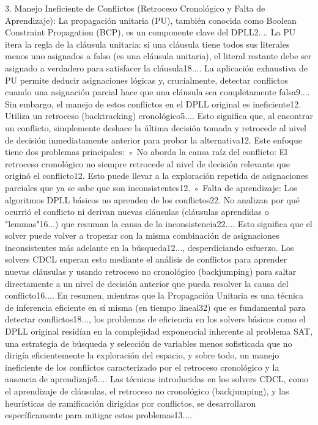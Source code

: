 3.
Manejo Ineficiente de Conflictos (Retroceso Cronológico y Falta de Aprendizaje): La propagación unitaria (PU), también conocida como Boolean Constraint Propagation (BCP), es un componente clave del DPLL2.... La PU itera la regla de la cláusula unitaria: si una cláusula tiene todos sus literales menos uno asignados a falso (es una cláusula unitaria), el literal restante debe ser asignado a verdadero para satisfacer la cláusula18.... La aplicación exhaustiva de PU permite deducir asignaciones lógicas y, crucialmente, detectar conflictos cuando una asignación parcial hace que una cláusula sea completamente falsa9.... Sin embargo, el manejo de estos conflictos en el DPLL original es ineficiente12. Utiliza un retroceso (backtracking) cronológico5.... Esto significa que, al encontrar un conflicto, simplemente deshace la última decisión tomada y retrocede al nivel de decisión inmediatamente anterior para probar la alternativa12. Este enfoque tiene dos problemas principales:
◦
No aborda la causa raíz del conflicto: El retroceso cronológico no siempre retrocede al nivel de decisión relevante que originó el conflicto12. Esto puede llevar a la exploración repetida de asignaciones parciales que ya se sabe que son inconsistentes12.
◦
Falta de aprendizaje: Los algoritmos DPLL básicos no aprenden de los conflictos22. No analizan por qué ocurrió el conflicto ni derivan nuevas cláusulas (cláusulas aprendidas o "lemmas"16...) que resuman la causa de la inconsistencia22.... Esto significa que el solver puede volver a tropezar con la misma combinación de asignaciones inconsistentes más adelante en la búsqueda12..., desperdiciando esfuerzo. Los solvers CDCL superan esto mediante el análisis de conflictos para aprender nuevas cláusulas y usando retroceso no cronológico (backjumping) para saltar directamente a un nivel de decisión anterior que pueda resolver la causa del conflicto16....
En resumen, mientras que la Propagación Unitaria es una técnica de inferencia eficiente en sí misma (en tiempo lineal32) que es fundamental para detectar conflictos18..., los problemas de eficiencia en los solvers básicos como el DPLL original residían en la complejidad exponencial inherente al problema SAT, una estrategia de búsqueda y selección de variables menos sofisticada que no dirigía eficientemente la exploración del espacio, y sobre todo, un manejo ineficiente de los conflictos caracterizado por el retroceso cronológico y la ausencia de aprendizaje5.... Las técnicas introducidas en los solvers CDCL, como el aprendizaje de cláusulas, el retroceso no cronológico (backjumping), y las heurísticas de ramificación dirigidas por conflictos, se desarrollaron específicamente para mitigar estos problemas13....
